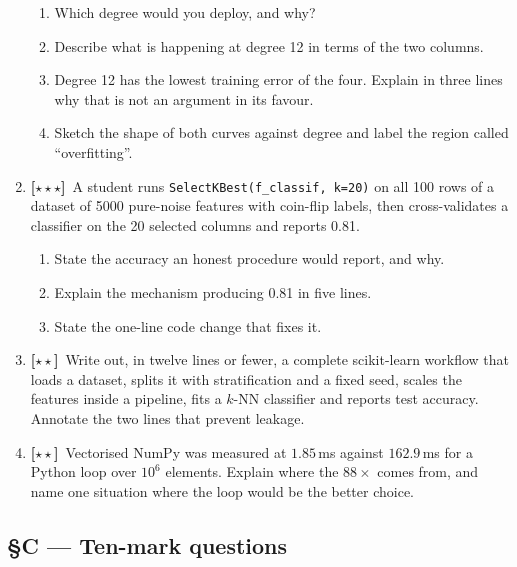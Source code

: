 \documentclass[11pt,a4paper]{article}
\newcommand{\LA}{{\footnotesize\textbf{[$\star\star\star$]}}}
\newcommand{\LB}{{\footnotesize\textbf{[$\star\star$]}}}
\newcommand{\Q}[1]{\item[\textbf{#1}]}
\begin{document}
\begin{enumerate}[leftmargin=2.2cm]
\begin{center}
\begin{tabular}{@{}lrr@{}}
  \bottomrule\end{tabular}\end{center}
  \begin{enumerate}[label=(\alph*)]
    \item Which degree would you deploy, and why?
    \item Describe what is happening at degree 12 in terms of the two columns.
    \item Degree 12 has the lowest training error of the four. Explain in three
      lines why that is not an argument in its favour.
    \item Sketch the shape of both curves against degree and label the region
      called ``overfitting''.
  \end{enumerate}
\Q{U1.18}\LA\ A student runs \texttt{SelectKBest(f\_classif, k=20)} on all
  100 rows of a dataset of 5000 pure-noise features with coin-flip labels, then
  cross-validates a classifier on the 20 selected columns and reports 0.81.
  \begin{enumerate}[label=(\alph*)]
    \item State the accuracy an honest procedure would report, and why.
    \item Explain the mechanism producing 0.81 in five lines.
    \item State the one-line code change that fixes it.
  \end{enumerate}
\Q{U1.19}\LB\ Write out, in twelve lines or fewer, a complete scikit-learn
  workflow that loads a dataset, splits it with stratification and a fixed
  seed, scales the features inside a pipeline, fits a $k$-NN classifier and
  reports test accuracy. Annotate the two lines that prevent leakage.
\Q{U1.20}\LB\ Vectorised NumPy was measured at $1.85$\,ms against $162.9$\,ms
  for a Python loop over $10^6$ elements. Explain where the $88\times$ comes
  from, and name one situation where the loop would be the better choice.
\end{enumerate}

\subsection*{§C --- Ten-mark questions}
\end{document}
